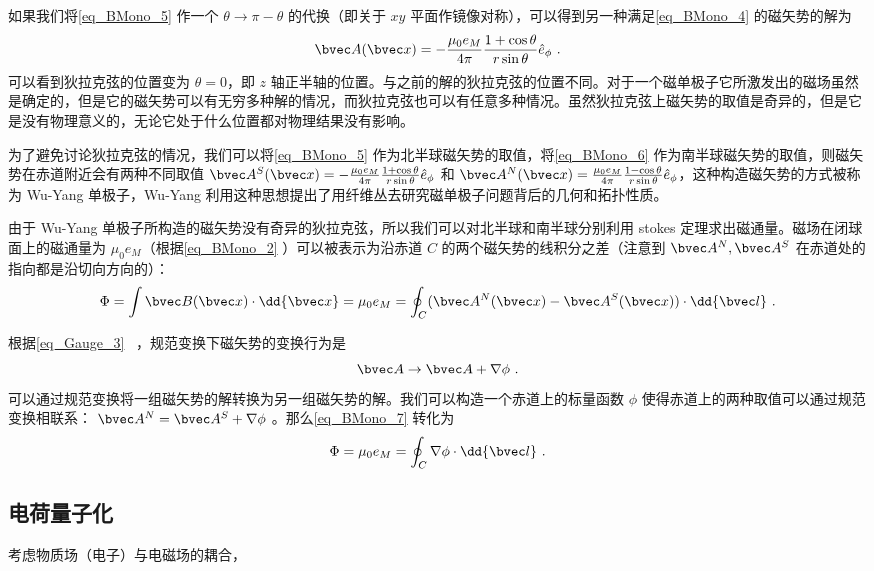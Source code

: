 如果我们将\autoref{eq_BMono_5} 作一个 $\theta\rightarrow \pi-\theta$ 的代换（即关于 $xy$ 平面作镜像对称），可以得到另一种满足\autoref{eq_BMono_4} 的磁矢势的解为
\begin{equation}\label{eq_BMono_6}
\bvec A(\bvec x)=-\frac{\mu_0 e_M}{4\pi}\frac{1+\cos\theta}{r\sin\theta}
\hat e_\phi~.
\end{equation}
可以看到狄拉克弦的位置变为 $\theta=0$，即 $z$ 轴正半轴的位置。与之前的解的狄拉克弦的位置不同。对于一个磁单极子它所激发出的磁场虽然是确定的，但是它的磁矢势可以有无穷多种解的情况，而狄拉克弦也可以有任意多种情况。虽然狄拉克弦上磁矢势的取值是奇异的，但是它是没有物理意义的，无论它处于什么位置都对物理结果没有影响。

为了避免讨论狄拉克弦的情况，我们可以将\autoref{eq_BMono_5} 作为北半球磁矢势的取值，将\autoref{eq_BMono_6} 作为南半球磁矢势的取值，则磁矢势在赤道附近会有两种不同取值 $\bvec A^S(\bvec x)=-\frac{\mu_0 e_M}{4\pi}\frac{1+\cos\theta}{r\sin\theta}
\hat e_\phi$ 和 $\bvec A^N(\bvec x)=\frac{\mu_0 e_M}{4\pi } \frac{1-\cos\theta}{r\sin\theta} \hat e_\phi$，这种构造磁矢势的方式被称为 Wu-Yang 单极子，Wu-Yang 利用这种思想提出了用纤维丛去研究磁单极子问题背后的几何和拓扑性质。

由于 Wu-Yang 单极子所构造的磁矢势没有奇异的狄拉克弦，所以我们可以对北半球和南半球分别利用 stokes 定理求出磁通量。磁场在闭球面上的磁通量为 $\mu_0 e_M$（根据\autoref{eq_BMono_2} ）可以被表示为沿赤道 $C$ 的两个磁矢势的线积分之差（注意到 $\bvec A^N,\bvec A^S$ 在赤道处的指向都是沿切向方向的）：
\begin{equation}\label{eq_BMono_7}
\Phi = \int \bvec B(\bvec x) \cdot \dd{\bvec x} = \mu_0 e_M = \oint_C (\bvec A^N(\bvec x)-\bvec A^S(\bvec x)) \cdot \dd{\bvec l} ~.
\end{equation}

根据\autoref{eq_Gauge_3}~ ，规范变换下磁矢势的变换行为是
\begin{equation}
\bvec A\rightarrow \bvec A+\nabla \phi~.
\end{equation}
可以通过规范变换将一组磁矢势的解转换为另一组磁矢势的解。我们可以构造一个赤道上的标量函数 $\phi$ 使得赤道上的两种取值可以通过规范变换相联系： $\bvec A^N = \bvec A^S + \nabla\phi$ 。那么\autoref{eq_BMono_7} 转化为
\begin{equation}
\Phi = \mu_0 e_M = \oint_C \nabla\phi \cdot \dd{\bvec l} ~.
\end{equation}

\subsection{电荷量子化}
考虑物质场（电子）与电磁场的耦合，